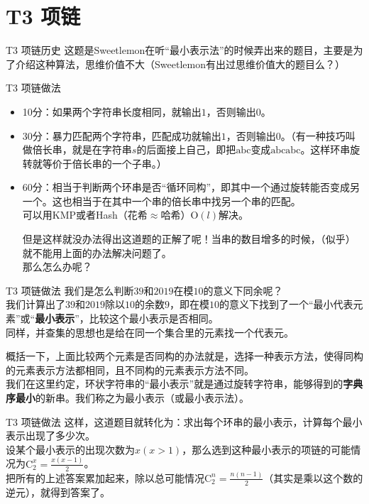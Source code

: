 \documentclass[utf8]{beamer}
\begin{document}
\section{T3 项链}
\begin{frame}{T3 项链}{历史}
    这题是Sweetlemon在听“最小表示法”的时候弄出来的题目，主要是为了介绍这种算法，思维价值不大（Sweetlemon有出过思维价值大的题目么？）
\end{frame}
\begin{frame}{T3 项链}{做法}
    \begin{itemize}
        \item 10分：如果两个字符串长度相同，就输出$1$，否则输出$0$。
        \pause
        \item 30分：暴力匹配两个字符串，匹配成功就输出$1$，否则输出$0$。（有一种技巧叫做倍长串，就是在字符串$s$的后面接上自己，即把$\text{abc}$变成$\text{abcabc}$。这样环串旋转就等价于倍长串的一个子串。）
        \pause
        \item 60分：相当于判断两个环串是否“循环同构”，即其中一个通过旋转能否变成另一个。这也相当于在其中一个串的倍长串中找另一个串的匹配。\\可以用KMP或者Hash（花希$\approx$哈希）$\text{O}(l)$解决。\newline
        
        \pause
        但是这样就没办法得出这道题的正解了呢！当串的数目增多的时候，（似乎）就不能用上面的办法解决问题了。\\
        那么怎么办呢？
    \end{itemize}
\end{frame}
\begin{frame}{T3 项链}{做法}
    我们是怎么判断$39$和$2019$在模$10$的意义下同余呢？\\
    我们计算出了$39$和$2019$除以$10$的余数$9$，即在模$10$的意义下找到了一个“最小代表元素”或“\textbf{最小表示}”，比较这个最小表示是否相同。\\
    同样，并查集的思想也是给在同一个集合里的元素找一个代表元。\newline
    \pause

    概括一下，上面比较两个元素是否同构的办法就是，选择一种表示方法，使得同构的元素表示方法都相同，且不同构的元素表示方法不同。\\
    我们在这里约定，环状字符串的“最小表示”就是通过旋转字符串，能够得到的\textbf{字典序最小}的新串。我们称之为最小表示（或最小表示法）。

\end{frame}
\begin{frame}{T3 项链}{做法}
    这样，这道题目就转化为：求出每个环串的最小表示，计算每个最小表示出现了多少次。\\
    设某个最小表示的出现次数为$x(x>1)$，那么选到这种最小表示的项链的可能情况为$\text{C}^{x}_{2}=\frac{x(x-1)}{2}$。\\
    把所有的上述答案累加起来，除以总可能情况$\text{C}^{n}_{2}=\frac{n(n-1)}{2}$（其实是乘以这个数的逆元），就得到答案了。
\end{frame}
\end{document}
